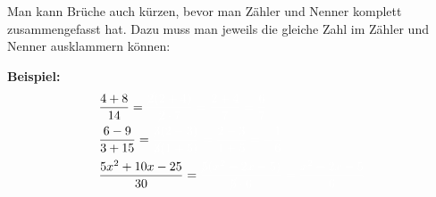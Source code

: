 Man kann Brüche auch kürzen, bevor man Zähler und Nenner komplett zusammengefasst hat. Dazu muss man jeweils die gleiche Zahl im Zähler und Nenner ausklammern können:

\textbf{Beispiel:}
\begin{align*}
	&\frac{4+8}{14}=\textcolor{loes}{\frac{\cancel{2}(2+4)}{\cancel{2}\cdot 7}=\frac{2+4}{7}=\frac{6}{7}}\\
	&\frac{6-9}{3+15}=\textcolor{loes}{\frac{\cancel{3}(2-3)}{\cancel{3}(1+5)}=\frac{2-3}{1+5}=-\frac{1}{6}}\\
	&\frac{5x^2+10x-25}{30}=\textcolor{loes}{\frac{\cancel{5}(x^2+2x-5)}{\cancel{5}\cdot 6}=\frac{x^2+2x-5}{6}}
\end{align*}

\newpage
\begin{Exercise}[title={Berechne die folgenden Ausdrücke und kürze soweit wie möglich}, label=bruecheA1]


\end{Exercise}

